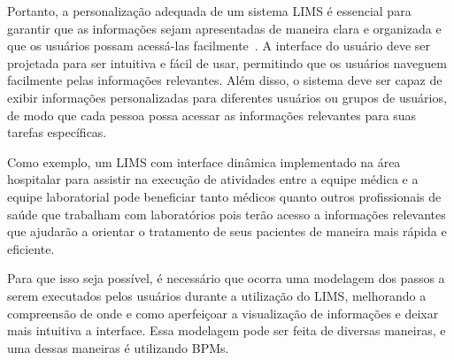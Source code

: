 Portanto, a personalização adequada de um sistema LIMS é essencial para garantir que as informações sejam apresentadas de maneira clara e organizada e que os usuários possam acessá-las facilmente~\cite{Tomlinson2022AOperations}. A interface do usuário deve ser projetada para ser intuitiva e fácil de usar, permitindo que os usuários naveguem facilmente pelas informações relevantes. Além disso, o sistema deve ser capaz de exibir informações personalizadas para diferentes usuários ou grupos de usuários, de modo que cada pessoa possa acessar as informações relevantes para suas tarefas específicas.


Como exemplo, um LIMS com interface dinâmica implementado na área hospitalar para assistir na execução de atividades entre a equipe médica e a equipe laboratorial pode beneficiar tanto médicos quanto outros profissionais de saúde que trabalham com laboratórios pois terão acesso a informações relevantes que ajudarão a orientar o tratamento de seus pacientes de maneira mais rápida e eficiente.

Para que isso seja possível, é necessário que ocorra uma modelagem dos passos a serem executados pelos usuários durante a utilização do LIMS, melhorando a compreensão de onde e como aperfeiçoar a visualização de informações e deixar mais intuitiva a interface. Essa modelagem pode ser feita de diversas maneiras, e uma dessas maneiras é utilizando BPMs.